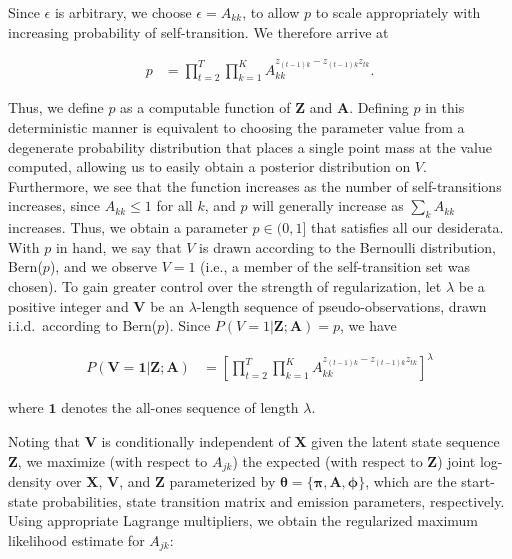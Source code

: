 \documentclass[letterpaper]{article}
\begin{document}
Since $\epsilon$ is arbitrary, we choose $\epsilon = A_{kk}$, to allow $p$ to scale appropriately with increasing probability of self-transition. We therefore arrive at

\vspace{-0.5cm}
\begin{align*}
    p &= \prod^{T}_{t=2}\prod^{K}_{k=1}A_{kk}^{z_{(t-1)k} - z_{(t-1)k}z_{tk}}.
\end{align*}
\vspace{-0.1cm}

Thus, we define $p$ as a computable function of $\mathbf{Z}$ and $\mathbf{A}$.
Defining $p$ in this deterministic manner is equivalent to choosing the
parameter value from a degenerate probability distribution that places a single
point mass at the value computed, allowing us to easily obtain a posterior
distribution on $V$. Furthermore, we see that the function increases as the
number of self-transitions increases, since $A_{kk} \leq 1$ for all $k$, and $p$
will generally increase as $\sum_k A_{kk}$ increases. Thus, we obtain a
parameter $p \in (0,1]$ that satisfies all our desiderata.
With $p$ in hand, we say that $V$ is drawn according to the Bernoulli
distribution, Bern($p$), and we observe $V = 1$ (i.e., a member of the
self-transition set was chosen). 
To gain greater control over the strength of regularization, let $\lambda$ be a
positive integer and $\mathbf{V}$ be an $\lambda$-length sequence of
pseudo-observations, drawn i.i.d.\ according to Bern($p$). Since $P(V =
1|\mathbf{Z};\mathbf{A}) = p$, we have

\vspace{-0.5cm}
\begin{align*}
    P(\mathbf{V} = \mathbf{1}|\mathbf{Z}; \mathbf{A}) &= \left[\prod^{T}_{t=2}\prod^{K}_{k=1}A_{kk}^{z_{(t-1)k} - z_{(t-1)k}z_{tk}}\right]^\lambda
\end{align*}
\vspace{-0.1cm}

where $\mathbf{1}$ denotes the all-ones sequence of length $\lambda$.

Noting that $\mathbf{V}$ is conditionally independent of $\mathbf{X}$ given the
latent state sequence $\mathbf{Z}$, we maximize (with respect to $A_{jk}$) the expected 
(with respect to $\mathbf{Z}$) joint log-density over $\mathbf{X}$, $\mathbf{V}$, and $\mathbf{Z}$ parameterized by
$\mathbf{\theta} = \{\mathbf{\pi},\mathbf{A}, \mathbf{\phi}\}$, which are the start-state
probabilities, state transition matrix and emission parameters, respectively. Using appropriate Lagrange multipliers, we obtain the regularized
maximum likelihood estimate for $A_{jk}$:
\end{document}
